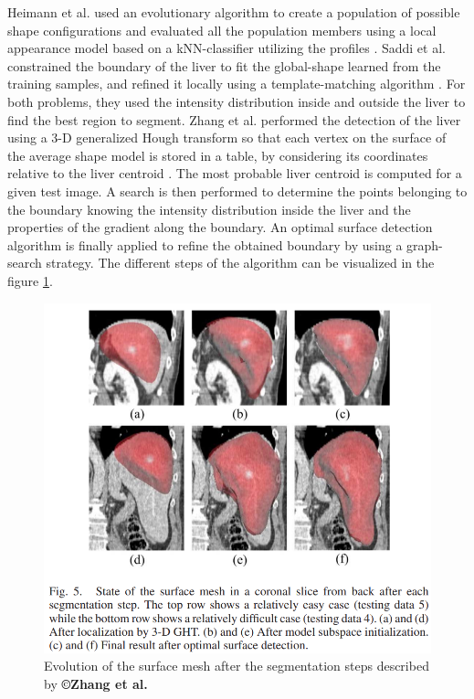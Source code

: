 \documentclass[]{article}
\begin{document}
	
	Heimann et al. used an evolutionary algorithm to create a population of
	possible shape configurations and evaluated all the population members
	using a local appearance model based on a kNN-classifier utilizing the
	profiles  \cite{Heimann2007}. 
	Saddi et al. constrained the boundary of the liver to fit the
	global-shape learned from the training samples, and refined it locally
	using a template-matching algorithm \cite{Saddi2007}. For both problems, they used the
	intensity distribution inside and outside the liver to find the best
	region to segment. Zhang et al. performed the detection of the liver using a 3-D
	generalized Hough transform so that each vertex on the surface of the
	average shape model is stored in a table, by considering its coordinates
	relative to the liver centroid \cite{Zhang2010}. The most probable liver centroid is
	computed for a given test image. A search is then performed to determine
	the points belonging to the boundary knowing the intensity distribution
	inside the liver and the properties of the gradient along the boundary.
	An optimal surface detection algorithm is finally applied to refine the
	obtained boundary by using a graph-search strategy. The different steps
	of the algorithm can be visualized in the figure \ref{Zhang2010_Fig5}.
	
	\begin{figure}[th!]
		\centering
		\includegraphics[width=0.5\linewidth]{images/image29}
		\caption{Evolution of the surface mesh after the segmentation steps described by \textbf{©Zhang et al.} \cite{Zhang2010}}
		\label{Zhang2010_Fig5}
	\end{figure}
	
\end{document}
